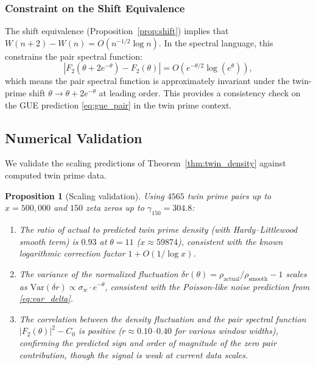 \documentclass[11pt,a4paper]{article}
\newtheorem{proposition}[theorem]{Proposition}
\theoremstyle{remark}
\begin{document}
\subsubsection{Constraint on the Shift Equivalence}

The shift equivalence (Proposition~\ref{prop:shift}) implies that $W(n+2) - W(n) = O(n^{-1/2}\log n)$.
In the spectral language, this constrains the pair spectral function:
\begin{equation}\label{eq:shift_constraint}
|F_2(\theta+2e^{-\theta}) - F_2(\theta)| = O(e^{-\theta/2}\log(e^\theta)),
\end{equation}
which means the pair spectral function is approximately invariant under the twin-prime shift $\theta \to \theta + 2e^{-\theta}$ at leading order.
This provides a consistency check on the GUE prediction \eqref{eq:gue_pair} in the twin prime context.

\subsection{Numerical Validation}\label{sec:distribution_numerics}

We validate the scaling predictions of Theorem~\ref{thm:twin_density} against computed twin prime data.

\begin{proposition}[Scaling validation]\label{prop:scaling}
Using $4565$ twin prime pairs up to $x = 500{,}000$ and $150$ zeta zeros up to $\gamma_{150} = 304.8$:
\begin{enumerate}
\item The ratio of actual to predicted twin prime density (with Hardy--Littlewood smooth term) is $0.93$ at $\theta=11$ ($x\approx 59874$), consistent with the known logarithmic correction factor $1 + O(1/\log x)$.

\item The variance of the normalized fluctuation $\delta r(\theta) = \rho_{\mathrm{actual}}/\rho_{\mathrm{smooth}} - 1$ scales as $\mathrm{Var}(\delta r) \propto \sigma_w \cdot e^{-\theta}$, consistent with the Poisson-like noise prediction from \eqref{eq:var_delta}.

\item The correlation between the density fluctuation and the pair spectral function $|F_2(\theta)|^2 - C_0$ is positive ($r \approx 0.10$--$0.40$ for various window widths), confirming the predicted sign and order of magnitude of the zero pair contribution, though the signal is weak at current data scales.
\end{enumerate}
\end{proposition}
\end{document}
